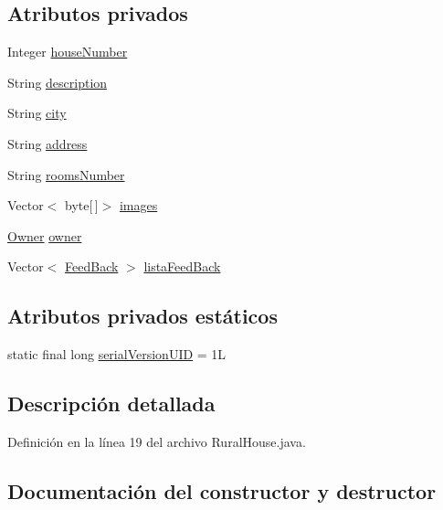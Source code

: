 \subsection*{Atributos privados}
\begin{DoxyCompactItemize}
\item 
Integer \mbox{\hyperlink{classdomain_1_1_rural_house_a1168b2c788d2f3bca3c54eee3b8734cb}{house\+Number}}
\item 
String \mbox{\hyperlink{classdomain_1_1_rural_house_afdc9d7b70bcc6baa94cae033a5684f0e}{description}}
\item 
String \mbox{\hyperlink{classdomain_1_1_rural_house_a4ac1bd1de58f97487abbcb8dc27a8077}{city}}
\item 
String \mbox{\hyperlink{classdomain_1_1_rural_house_a6ba346c74cb3404ca6d04a2ebae730d3}{address}}
\item 
String \mbox{\hyperlink{classdomain_1_1_rural_house_a1cda0eff05ad06090ac37a259fdad562}{rooms\+Number}}
\item 
Vector$<$ byte\mbox{[}$\,$\mbox{]}$>$ \mbox{\hyperlink{classdomain_1_1_rural_house_a6009294a82be0d6cbd824e49479be51a}{images}}
\item 
\mbox{\hyperlink{classdomain_1_1_owner}{Owner}} \mbox{\hyperlink{classdomain_1_1_rural_house_ab7cf574fe34e0feacd2f748682163281}{owner}}
\item 
Vector$<$ \mbox{\hyperlink{classdomain_1_1_feed_back}{Feed\+Back}} $>$ \mbox{\hyperlink{classdomain_1_1_rural_house_a9ea6b00b3801e89619b93ba995b0ec32}{lista\+Feed\+Back}}
\end{DoxyCompactItemize}
\subsection*{Atributos privados estáticos}
\begin{DoxyCompactItemize}
\item 
static final long \mbox{\hyperlink{classdomain_1_1_rural_house_a985b2c72e90db2433da073e99c581cdc}{serial\+Version\+U\+ID}} = 1L
\end{DoxyCompactItemize}


\subsection{Descripción detallada}


Definición en la línea 19 del archivo Rural\+House.\+java.



\subsection{Documentación del constructor y destructor}
\mbox{\label{classdomain_1_1_rural_house_a5e1f42ad6b3992bfc5fdece628455552}} 
